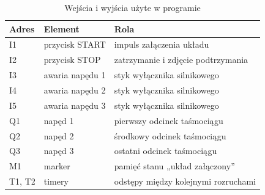 \begin{table}[h]
    \centering
    \caption{Wejścia i wyjścia użyte w programie}
    \label{tab:io}
    \begin{tabular}{|l|l|p{8.5cm}|}
        \hline
        \textbf{Adres} & \textbf{Element} & \textbf{Rola} \\
        \hline
        I1 & przycisk START & impuls załączenia układu \\
        \hline
        I2 & przycisk STOP & zatrzymanie i zdjęcie podtrzymania \\
        \hline
        I3 & awaria napędu 1 & styk wyłącznika silnikowego \\
        \hline
        I4 & awaria napędu 2 & styk wyłącznika silnikowego \\
        \hline
        I5 & awaria napędu 3 & styk wyłącznika silnikowego \\
        \hline
        Q1 & napęd 1 & pierwszy odcinek taśmociągu \\
        \hline
        Q2 & napęd 2 & środkowy odcinek taśmociągu \\
        \hline
        Q3 & napęd 3 & ostatni odcinek taśmociągu \\
        \hline
        M1 & marker & pamięć stanu „układ załączony” \\
        \hline
        T1, T2 & timery & odstępy między kolejnymi rozruchami \\
        \hline
    \end{tabular}
\end{table}


